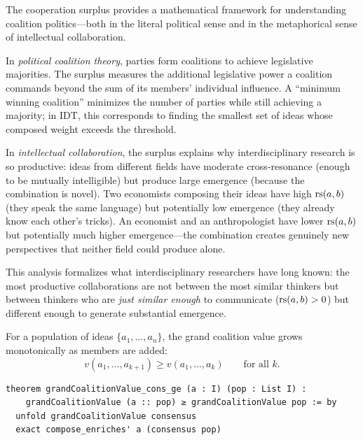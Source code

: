 \begin{interpretation}
\label{interp:coalition-politics}
The cooperation surplus provides a mathematical framework for understanding
coalition politics---both in the literal political sense and in the
metaphorical sense of intellectual collaboration.

In \emph{political coalition theory}, parties form coalitions to achieve
legislative majorities.  The surplus measures the additional legislative
power a coalition commands beyond the sum of its members' individual
influence.  A ``minimum winning coalition'' minimizes the number of parties
while still achieving a majority; in IDT, this corresponds to finding the
smallest set of ideas whose composed weight exceeds the threshold.

In \emph{intellectual collaboration}, the surplus explains why
interdisciplinary research is so productive: ideas from different fields
have moderate cross-resonance (enough to be mutually intelligible) but
produce large emergence (because the combination is novel).  Two economists
composing their ideas have high $\mathrm{rs}(a, b)$ (they speak the same language)
but potentially low emergence (they already know each other's tricks).
An economist and an anthropologist have lower $\mathrm{rs}(a, b)$ but potentially
much higher emergence---the combination creates genuinely new perspectives
that neither field could produce alone.

This analysis formalizes what interdisciplinary researchers have long known:
the most productive collaborations are not between the most similar
thinkers but between thinkers who are \emph{just similar enough} to
communicate ($\mathrm{rs}(a, b) > 0$) but different enough to generate substantial
emergence.
\end{interpretation}

\begin{theorem}
\label{thm:grand-coalition-growth}
For a population of ideas $\{a_1, \ldots, a_n\}$, the grand coalition value
grows monotonically as members are added:
\[
  v(a_1, \ldots, a_{k+1}) \geq v(a_1, \ldots, a_k)
  \qquad \text{for all } k.
\]

\begin{lstlisting}[caption={Lean 4: Grand coalition monotonicity}]
theorem grandCoalitionValue_cons_ge (a : I) (pop : List I) :
    grandCoalitionValue (a :: pop) ≥ grandCoalitionValue pop := by
  unfold grandCoalitionValue consensus
  exact compose_enriches' a (consensus pop)
\end{lstlisting}
\end{theorem}

